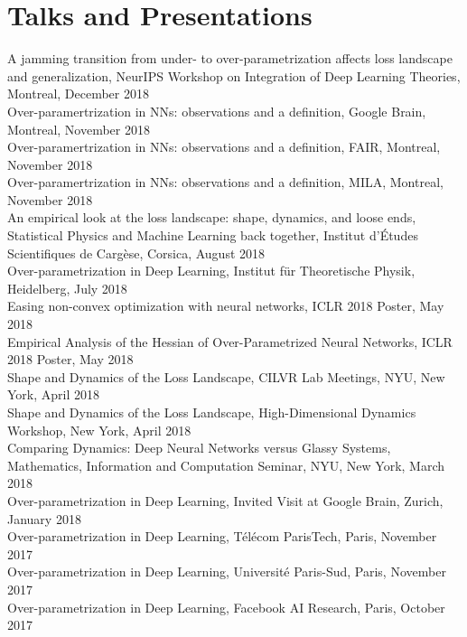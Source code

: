 \documentclass[10pt,letterpaper]{article}
\renewenvironment{itemize}
{
\begin{list}{}{\setlength{\leftmargin}{1.5em}}
}
{
  \end{list}
}
\begin{document}
\section*{Talks and Presentations}
\begin{itemize}
\item A jamming transition from under- to over-parametrization affects loss landscape and generalization, NeurIPS Workshop on Integration of Deep Learning Theories, Montreal, December 2018 \\
Over-paramertrization in NNs: observations and a definition, Google Brain, Montreal, November 2018 \\
Over-paramertrization in NNs: observations and a definition, FAIR, Montreal, November 2018 \\
Over-paramertrization in NNs: observations and a definition, MILA, Montreal, November 2018 \\
An empirical look at the loss landscape: shape, dynamics, and loose ends, Statistical Physics and Machine Learning back together, Institut d'\'Etudes Scientifiques de Carg\`ese, Corsica, August 2018 \\
Over-parametrization in Deep Learning, Institut f\"ur Theoretische Physik, Heidelberg, July 2018 \\
Easing non-convex optimization with neural networks, ICLR 2018 Poster, May 2018 \\
Empirical Analysis of the Hessian of Over-Parametrized Neural Networks, ICLR 2018 Poster, May 2018 \\
Shape and Dynamics of the Loss Landscape, CILVR Lab Meetings, NYU, New York, April 2018 \\
Shape and Dynamics of the Loss Landscape, High-Dimensional Dynamics Workshop, New York, April 2018 \\
Comparing Dynamics: Deep Neural Networks versus Glassy Systems, Mathematics, Information and Computation Seminar, NYU, New York, March 2018 \\ 
Over-parametrization in Deep Learning, Invited Visit at Google Brain, Zurich, January 2018 \\ 
Over-parametrization in Deep Learning, T\'el\'ecom ParisTech, Paris, November 2017 \\ 
Over-parametrization in Deep Learning, Universit\'e Paris-Sud, Paris, November 2017 \\ 
Over-parametrization in Deep Learning, Facebook AI Research, Paris, October 2017 \\ 

\end{itemize}
\end{document}
